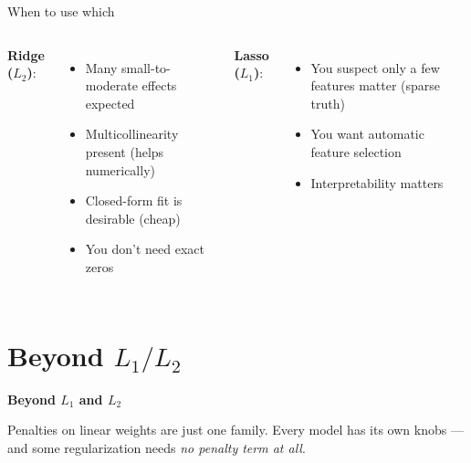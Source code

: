\documentclass[aspectratio=169]{beamer}
\begin{document}
\begin{frame}{When to use which}
  \begin{columns}[T]
    \textbf{Ridge ($L_2$)}:
    \begin{itemize}\small
      \item Many small-to-moderate effects expected
      \item Multicollinearity present (helps numerically)
      \item Closed-form fit is desirable (cheap)
      \item You don't need exact zeros
    \end{itemize}
    \textbf{Lasso ($L_1$)}:
    \begin{itemize}\small
      \item You suspect only a few features matter (sparse truth)
      \item You want automatic feature selection
      \item Interpretability matters
    \end{itemize}
  \end{columns}
  \vfill
\end{frame}

\section{Beyond \texorpdfstring{$L_1/L_2$}{L1/L2}}

\begin{frame}[plain]
  \vfill
  \begin{center}
    {\Large\color{popblue}\textbf{Beyond $L_1$ and $L_2$}}\\[0.9em]
    \begin{minipage}{0.8\textwidth}\centering\small
      Penalties on linear weights are just one family. Every model has its own knobs ---
      and some regularization needs \emph{no penalty term at all}.
    \end{minipage}
  \end{center}
  \vfill
\end{frame}
\end{document}
